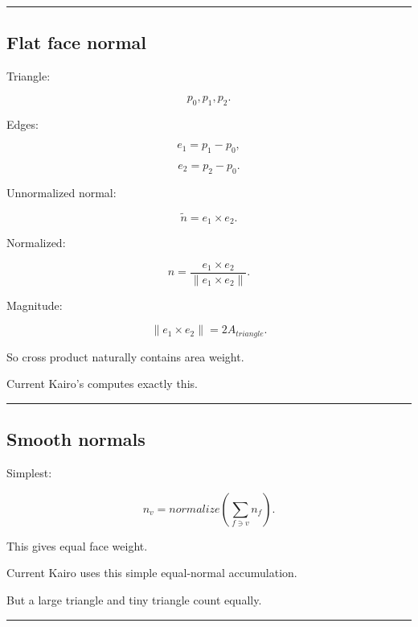 \hypertarget{04-visual-computing-ii-ch041-normals-tangents-bounds-and-obj}{}

\begin{center}\rule{0.5\linewidth}{0.5pt}\end{center}

\subsection{Flat face normal}\label{04-visual-computing-ii-ch041-flat-face-normal}

\hypertarget{04-visual-computing-ii-ch041-flat-face-normal}{}

Triangle:

\[
p_0,p_1,p_2.
\]

Edges:

\[
e_1=p_1-p_0,
\]

\[
e_2=p_2-p_0.
\]

Unnormalized normal:

\[
\tilde n=
e_1\times e_2.
\]

Normalized:

\[
\boxed{
n=
\frac{
e_1\times e_2
}{
\|e_1\times e_2\|
}.
}
\]

Magnitude:

\[
\|e_1\times e_2\|
=
2A_{triangle}.
\]

So cross product naturally contains area weight.

Current Kairo's  computes exactly this.

\begin{center}\rule{0.5\linewidth}{0.5pt}\end{center}

\subsection{Smooth normals}\label{04-visual-computing-ii-ch041-smooth-normals}

\hypertarget{04-visual-computing-ii-ch041-smooth-normals}{}

Simplest:

\[
n_v=
normalize
\left(
\sum_{f\ni v}
n_f
\right).
\]

This gives equal face weight.

Current Kairo  uses this simple equal-normal accumulation.

But a large triangle and tiny triangle count equally.

\begin{center}\rule{0.5\linewidth}{0.5pt}\end{center}

